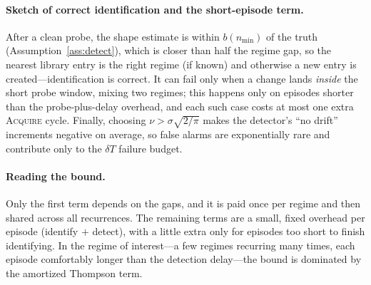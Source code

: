 \documentclass[11pt]{article}
\newcommand{\ACQ}{\textsc{Acquire}\xspace}
\begin{document}
\paragraph{Sketch of correct identification and the short-episode term.}
After a clean probe, the shape estimate is within $b(n_{\min})$ of the truth
(Assumption~\ref{ass:detect}), which is closer than half the regime gap, so the nearest library
entry is the right regime (if known) and otherwise a new entry is created---identification is
correct. It can fail only when a change lands \emph{inside} the short probe window, mixing two
regimes; this happens only on episodes shorter than the probe-plus-delay overhead, and each such
case costs at most one extra \ACQ cycle. Finally, choosing $\nu>\sigma\sqrt{2/\pi}$ makes the
detector's ``no drift'' increments negative on average, so false alarms are exponentially rare and
contribute only to the $\delta T$ failure budget.

\paragraph{Reading the bound.}
Only the first term depends on the gaps, and it is paid once per regime and then shared across all
recurrences. The remaining terms are a small, fixed overhead per episode (identify $+$ detect),
with a little extra only for episodes too short to finish identifying. In the regime of
interest---a few regimes recurring many times, each episode comfortably longer than the detection
delay---the bound is dominated by the amortized Thompson term.
\end{document}
